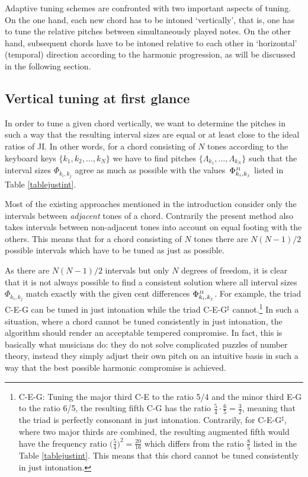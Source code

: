  
Adaptive tuning schemes are confronted with two important aspects of tuning. On the one hand, each new chord has to be intoned `vertically', that is, one has to tune the relative pitches between simultaneously played notes. On the other hand, subsequent chords have to be intoned relative to each other in `horizontal' (temporal) direction according to the harmonic progression, as will be discussed in the following section.

\subsection{Vertical tuning at first glance}

In order to tune a given chord vertically, we want to determine the pitches in such a way that the resulting interval sizes are equal or at least close to the ideal ratios of JI. In other words, for a chord consisting of $N$ tones according to the keyboard keys $\{k_1,k_2,\ldots,k_N\}$ we have to find pitches $\{\Lambda_{k_1},\ldots,\Lambda_{k_N}\}$ such that the interval sizes $\Phi_{k_i,k_j}$ agree as much as possible with the values~$\Phi^{\rm\scriptscriptstyle JI}_{k_i,k_j}$ listed in Table \ref{tablejustint}.

Most of the existing approaches mentioned in the introduction consider only the intervals between \textit{adjacent} tones of a chord. Contrarily the present method also takes intervals between non-adjacent tones into account on equal footing with the others. This means that for a chord consisting of $N$ tones there are $N(N-1)/2$ possible intervals which have to be tuned as just as possible.

As there are $N(N-1)/2$ intervals but only $N$ degrees of freedom, it is clear that it is not always possible to find a consistent solution where all interval sizes $\Phi_{k_i,k_j}$ match exactly with the given cent differences $\Phi^{\rm\scriptscriptstyle JI}_{k_i,k_j}$. For example, the triad C-E-G can be tuned in just intonation while the triad C-E-G$^\sharp$ cannot.\footnote{C-E-G: Tuning the major third C-E to the ratio 5/4 and the minor third E-G to the ratio 6/5, the resulting fifth C-G has the  ratio $\frac54\cdot \frac65 = \frac32$, meaning that the triad is perfectly consonant in just intonation. Contrarily, for C-E-G$^\sharp$, where two major thirds are combined, the resulting augmented fifth would have the frequency ratio $\bigl( \frac54\bigr)^2=\frac{20}{16}$ which differs from the ratio $\frac85$ listed in the Table \ref{tablejustint}. This means that this chord cannot be tuned consistently in just intonation.} In such a situation, where a chord cannot be tuned consistently in just intonation, the algorithm should render an acceptable tempered compromise. In fact, this is basically what musicians do: they do not solve complicated puzzles of number theory, instead they simply adjust their own pitch on an intuitive basis in such a way that the best possible harmonic compromise is achieved.

